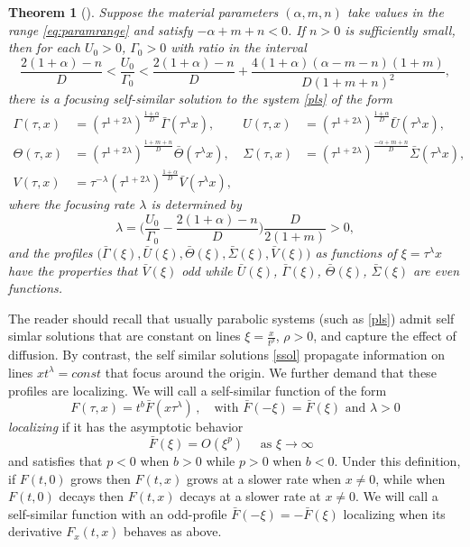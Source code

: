 \documentclass[a4paper,11pt]{article}
\def\bG{{\bar{\Gamma}}}
\def\bV{{\bar{V}}}
\def\bTh{{\bar{\Theta}}}
\def\bS{{\bar{\Sigma}}}
\def\bU{{\bar{U}}}
\def\BO{{{O}}}
\newtheorem{theorem}{Theorem}
\theoremstyle{remark}
\begin{document}
\begin{theorem}[\cite{LKT17}] \label{mainthm1}
Suppose the material parameters $(\alpha, m, n)$ take values in the range \eqref{eq:paramrange} and satisfy $-\alpha+m+n<0$. If $n>0$ is sufficiently small, then
for each $U_0>0$, $\Gamma_0>0$ with ratio in the interval
\begin{equation} \label{eq:restriction}
 \frac{2(1+\alpha) -n}{D} < \frac{U _0}{\Gamma _0} < \frac{2(1+\alpha) -n}{D} + \frac{4(1+\alpha)(\alpha-m-n)(1+m)}{D(1+m+n)^2},
\end{equation}
there is a focusing self-similar solution to the system \eqref{pls} of the form
\begin{equation}
\label{ssol}
\begin{aligned}
 \Gamma (\tau,x) &= \left(\tau^{1+ 2 \lambda}\right) ^{ \frac{1+ \alpha}{D}} \bG(\tau ^\lambda x), & U (\tau,x) &=\left(\tau^{1+ 2 \lambda}\right) ^{ \frac{1+ \alpha}{D}} \bU( \tau ^\lambda x),\\
 \Theta (\tau,x) &= \left(\tau^{1+ 2 \lambda}\right) ^{ \frac{1+ m +n}{D}} \bTh( \tau ^\lambda x), & \Sigma (\tau,x) &= \left(\tau^{1+ 2 \lambda}\right) ^{ \frac{- \alpha +m+n}{D}} \bS( \tau ^\lambda x),\\
 V (\tau,x) &= \tau ^{-\lambda} \left(\tau^{1+ 2 \lambda}\right) ^{ \frac{1+ \alpha}{D}} \bV( \tau ^\lambda x),
\end{aligned}
\end{equation}
where the focusing rate $\lambda$ is determined by
\begin{equation} \label{eq:lambda}
 \lambda = \Big(\frac{U _0}{\Gamma _0} - \frac{2(1+\alpha)-n}{D}\Big)\frac{D}{2(1+m)}  > 0 ,
\end{equation}
and the profiles $\big(\bG(\xi), \bU(\xi), \bTh(\xi),\bS(\xi),\bV(\xi)\big)$ as  functions of $\xi = \tau^\lambda x$ have the properties
that $\bV(\xi)$ odd while  $\bU (\xi)$, $\bG(\xi)$, $\bTh(\xi)$, $\bS(\xi)$ are even functions.
\end{theorem}


The reader should recall that  usually parabolic systems (such as \eqref{pls}) admit self simlar solutions that are constant on lines $\xi = \frac{x}{t^\rho}$, $\rho > 0$, and capture
the effect of diffusion. By contrast, the self similar solutions  \eqref{ssol} propagate information on lines $x t^\lambda = const$ that focus around the origin.
We further demand that these profiles are localizing. We will call a self-similar function of the form
$$
F(\tau,x) = t^b \bar F(x \tau^\lambda) \, , \quad \mbox{with $\bar F(-\xi) = \bar F(\xi)$ and $\lambda > 0$}
$$
{\it localizing} if it has the asymptotic behavior
$$
\bar F(\xi) = \BO (\xi^p)    \quad \mbox{ as $\xi \to \infty$ }
$$
and satisfies that $p < 0$ when $b > 0$ while $p > 0$ when $b < 0$. Under this definition, if $F(t,0)$ grows then $F(t,x)$ grows at a slower
rate when $x \ne 0$, while when $F(t,0)$ decays then $F(t,x)$ decays at a slower rate at $x \ne 0$. We will call a self-similar function with an odd-profile
$\bar F(-\xi) = - \bar F(\xi)$ localizing when its derivative $F_x( t,x)$  behaves as above.
\end{document}
